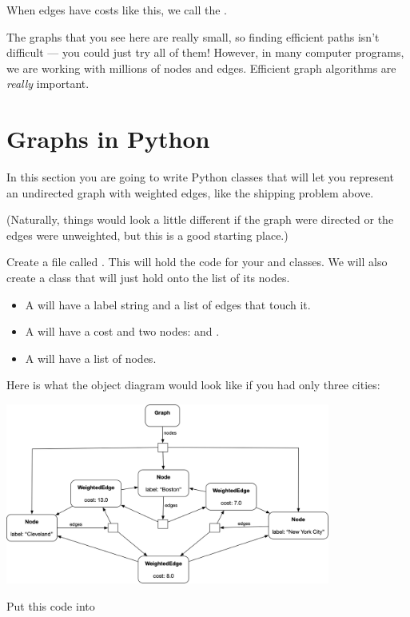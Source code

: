When edges have costs like this,  we call the .

The graphs that you see here are really small, so finding efficient
paths isn't difficult --- you could just try all of them! However, in
many computer programs, we are working with millions of nodes and
edges.  Efficient graph algorithms are \textit{really} important.

\section{Graphs in Python}

In this section you are going to write Python classes that will let
you represent an undirected graph with weighted edges, like the
shipping problem above.

(Naturally, things would look a little different if the graph were
directed or the edges were unweighted, but this is a good starting
place.)

Create a file called .  This will hold the code for
your  and  classes.  We will also
create a  class that will just hold onto the list of
its nodes.

\begin{itemize}
\item A  will have a label string and a list of edges that touch it.
\item A  will have a cost and two nodes:  and .
\item A  will have a list of nodes.
\end{itemize}

Here is what the object diagram would look like if you had only three cities:

\includegraphics[width=0.8\textwidth]{objdiagram.png}

Put this code into 

